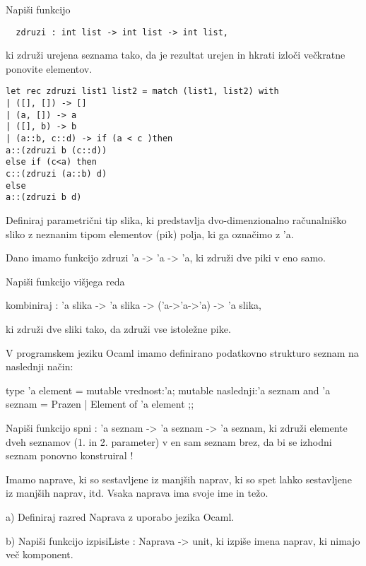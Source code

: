 \begin{ex}
  Napi\v si funkcijo

  \begin{verbatim}
  zdruzi : int list -> int list -> int list,
  \end{verbatim}

  ki zdru\v zi urejena seznama tako, da je rezultat urejen in hkrati
  izlo\v ci ve\v ckratne ponovite elementov.


\begin{sol}
\begin{verbatim}
let rec zdruzi list1 list2 = match (list1, list2) with
| ([], []) -> []
| (a, []) -> a
| ([], b) -> b
| (a::b, c::d) -> if (a < c )then 
a::(zdruzi b (c::d))
else if (c<a) then 
c::(zdruzi (a::b) d)
else 
a::(zdruzi b d)
\end{verbatim}
\end{sol}

\end{ex} 
\begin{ex}
  Definiraj parametri\v cni tip slika, ki predstavlja
  dvo-dimenzionalno ra\v cunalni\v sko sliko z neznanim tipom
  elementov (pik) polja, ki ga ozna\v cimo z 'a.

  Dano imamo funkcijo zdruzi 'a -> 'a -> 'a, ki zdru\v zi dve piki v
  eno samo.

  Napi\v si funkcijo vi\v sjega reda

  kombiniraj : 'a slika -> 'a slika -> ('a->'a->'a) -> 'a slika,

  ki zdru\v zi dve sliki tako, da zdru\v zi vse istole\v zne pike.


\end{ex} 
\begin{ex}
  V programskem jeziku Ocaml imamo definirano podatkovno strukturo
  seznam na naslednji na\v cin:

  type 'a element = { 
     mutable vrednost:'a; 
     mutable naslednji:'a seznam 
  }
  and 'a seznam = Prazen | Element of 'a element ;;

  Napi\v si funkcijo spni : 'a seznam -> 'a seznam -> 'a seznam, ki
  zdru\v zi elemente dveh seznamov (1. in 2. parameter) v en sam
  seznam brez, da bi se izhodni seznam ponovno konstruiral !


\end{ex} 
\begin{ex}
  Imamo naprave, ki so sestavljene iz manj\v sih naprav, ki so spet
  lahko sestavljene iz manj\v sih naprav, itd. Vsaka naprava ima svoje
  ime in te\v zo.
  
  a) Definiraj razred Naprava z uporabo jezika Ocaml.

  b) Napi\v si funkcijo izpisiListe : Naprava -> unit, ki izpi\v se
  imena naprav, ki nimajo ve\v c komponent.



\end{ex} 
